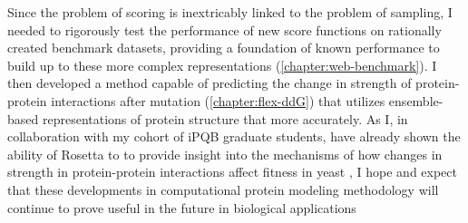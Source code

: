 Since the problem of scoring is inextricably linked to the problem of sampling, I needed to rigorously test the performance of new score functions on rationally created benchmark datasets, providing a foundation of known performance to build up to these more complex representations (\cref{chapter:web-benchmark}).
I then developed a method capable of predicting the change in strength of protein-protein interactions after mutation (\cref{chapter:flex-ddG}) that utilizes ensemble-based representations of protein structure that more accurately.
As I, in collaboration with my cohort of iPQB graduate students, have already shown the ability of Rosetta to to provide insight into the mechanisms of how changes in strength in protein-protein interactions affect fitness in yeast \cite{mavor_determination_2016,mavor_extending_2017}, I hope and expect that these developments in computational protein modeling methodology will continue to prove useful in the future in biological applications